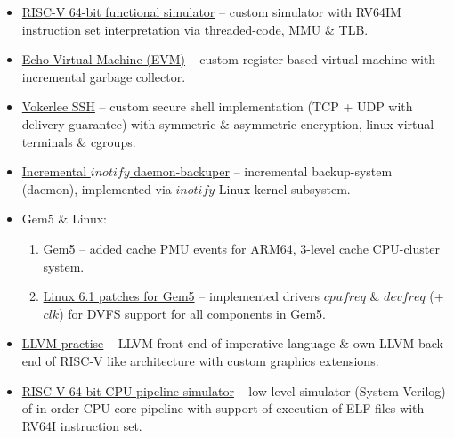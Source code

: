    \begin{itemize}
        \item \href{https://github.com/Vokerlee/riscv64-simulator}
                   {RISC-V 64-bit functional simulator} -- custom simulator with RV64IM instruction set
            interpretation via threaded-code, MMU \& TLB.
        \item \href{https://github.com/Vokerlee/EVM}
                   {Echo Virtual Machine (EVM)} -- custom register-based virtual machine
            with incremental garbage collector.
        \item \href{https://github.com/Vokerlee/VSSH}
                   {Vokerlee SSH} -- custom secure shell implementation (TCP + UDP with delivery guarantee)
            with symmetric \& asymmetric encryption, linux virtual terminals \& cgroups.
        \item \href{https://github.com/Vokerlee/linux-api-course/tree/master/5.%20Daemon-backuper}
                   {Incremental $inotify$ daemon-backuper} -- incremental backup-system (daemon), implemented 
            via $inotify$ Linux kernel subsystem.
        \item Gem5 \& Linux:
        \begin{enumerate}
            \item \href{https://github.com/Vokerlee/gem5-arm-dev}
                       {Gem5} -- added cache PMU events for ARM64, 3-level cache CPU-cluster system.
            \item \href{https://github.com/Vokerlee/linux-6.1-arm-gem5}
                       {Linux 6.1 patches for Gem5} -- implemented drivers $cpufreq$ \& $devfreq$   (+ $clk$)
                for DVFS support for all components in Gem5.
        \end{enumerate}
        \item \href{https://github.com/Vokerlee/llvm-practice}
                   {LLVM practise} -- LLVM front-end of imperative language \& own LLVM back-end of RISC-V like
            architecture with custom graphics extensions.
        \item \href{https://github.com/Vokerlee/cpu-riscv64-pipeline}
                   {RISC-V 64-bit CPU pipeline simulator} -- low-level simulator (System Verilog) of in-order CPU
            core pipeline with support of execution of ELF files with RV64I instruction set.

    \end{itemize}

\clearpage

